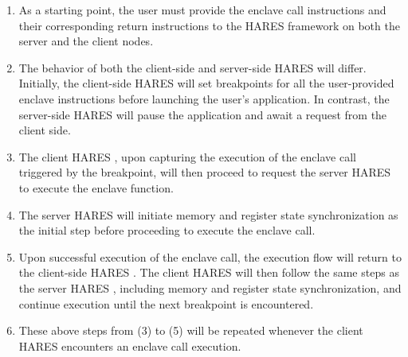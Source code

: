 \documentclass[article, doublespace,nopageskip]{VTthesis} %
\newcommand{\monitor}{HARES }
\begin{document}

    \begin{enumerate}
        \item As a starting point, the user must provide the enclave call instructions and their corresponding return instructions to the \monitor framework on both the server and the client nodes. 
        \item The behavior of both the client-side and server-side \monitor will differ. Initially, the client-side \monitor will set breakpoints for all the user-provided enclave instructions before launching the user's application. In contrast, the server-side \monitor will pause the application and await a request from the client side.
        \item The client \monitor, upon capturing the execution of the enclave call triggered by the breakpoint, will then proceed to request the server \monitor to execute the enclave function.
        \item The server \monitor will initiate memory and register state synchronization as the initial step before proceeding to execute the enclave call.
        \item Upon successful execution of the enclave call, the execution flow will return to the client-side \monitor. The client \monitor will then follow the same steps as the server \monitor, including memory and register state synchronization, and continue execution until the next breakpoint is encountered.
        \item These above steps from (3) to (5) will be repeated whenever the client \monitor encounters an enclave call execution.
    \end{enumerate}
\end{document}
